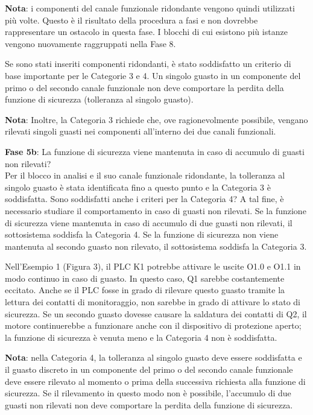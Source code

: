 \documentclass[a4paper,11pt]{article}
\begin{document}
    \par\medskip\noindent \textbf{Nota}: i componenti del canale funzionale ridondante vengono quindi utilizzati più volte. Questo è il risultato della procedura a fasi e non dovrebbe rappresentare un ostacolo in questa fase. I blocchi di cui esistono più istanze vengono nuovamente raggruppati nella Fase 8.
    
    Se sono stati inseriti componenti ridondanti, è stato soddisfatto un criterio di base importante per le Categorie 3 e 4. Un singolo guasto in un componente del primo o del secondo canale funzionale non deve comportare la perdita della funzione di sicurezza (tolleranza al singolo guasto).
    \par\medskip\noindent \textbf{Nota}: Inoltre, la Categoria 3 richiede che, ove ragionevolmente possibile, vengano rilevati singoli guasti nei componenti all'interno dei due canali funzionali.
    
    \par\medskip\noindent \textbf{Fase 5b}: La funzione di sicurezza viene mantenuta in caso di accumulo di guasti non rilevati?\\
    Per il blocco in analisi e il suo canale funzionale ridondante, la tolleranza al singolo guasto è stata identificata fino a questo punto e la Categoria 3 è soddisfatta. Sono soddisfatti anche i criteri per la Categoria 4? A tal fine, è necessario studiare il comportamento in caso di guasti non rilevati. Se la funzione di sicurezza viene mantenuta in caso di accumulo di due guasti non rilevati, il sottosistema soddisfa la Categoria 4. Se la funzione di sicurezza non viene mantenuta al secondo guasto non rilevato, il sottosistema soddisfa la Categoria 3.
    
    Nell'Esempio 1 (Figura 3), il PLC K1 potrebbe attivare le uscite O1.0 e O1.1 in modo continuo in caso di guasto. In questo caso, Q1 sarebbe costantemente eccitato. Anche se il PLC fosse in grado di rilevare questo guasto tramite la lettura dei contatti di monitoraggio, non sarebbe in grado di attivare lo stato di sicurezza. Se un secondo guasto dovesse causare la saldatura dei contatti di Q2, il motore continuerebbe a funzionare anche con il dispositivo di protezione aperto; la funzione di sicurezza è venuta meno e la Categoria 4 non è soddisfatta.
    
    \par\medskip\noindent \textbf{Nota}: nella Categoria 4, la tolleranza al singolo guasto deve essere soddisfatta e il guasto discreto in un componente del primo o del secondo canale funzionale deve essere rilevato al momento o prima della successiva richiesta alla funzione di sicurezza. Se il rilevamento in questo modo non è possibile, l'accumulo di due guasti non rilevati non deve comportare la perdita della funzione di sicurezza.
    
\end{document}
